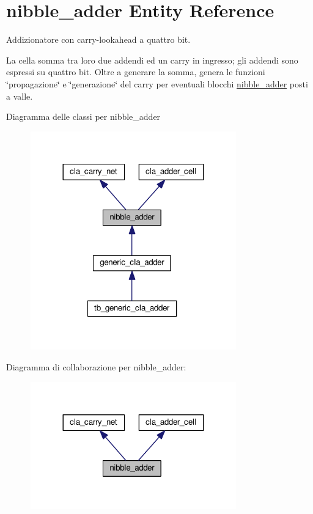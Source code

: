\hypertarget{classnibble__adder}{\section{nibble\+\_\+adder Entity Reference}
\label{classnibble__adder}
}


Addizionatore con carry-\/lookahead a quattro bit.

La cella somma tra loro due addendi ed un carry in ingresso; gli addendi sono espressi su quattro bit. Oltre a generare la somma, genera le funzioni \char`\"{}propagazione\char`\"{} e \char`\"{}generazione\char`\"{} del carry per eventuali blocchi \hyperlink{classnibble__adder}{nibble\+\_\+adder} posti a valle.  




Diagramma delle classi per nibble\+\_\+adder\nopagebreak
\begin{figure}[H]
\begin{center}
\leavevmode
\includegraphics[width=252pt]{classnibble__adder__inherit__graph}
\end{center}
\end{figure}


Diagramma di collaborazione per nibble\+\_\+adder\+:\nopagebreak
\begin{figure}[H]
\begin{center}
\leavevmode
\includegraphics[width=252pt]{classnibble__adder__coll__graph}
\end{center}
\end{figure}
